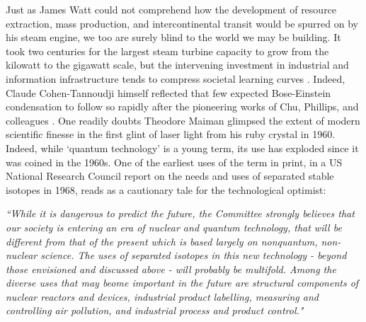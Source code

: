 	\noindent  Just as James Watt could not comprehend how the development of resource extraction, mass production, and intercontinental transit would be spurred on by his steam engine, we too are surely blind to the world we {may} be building.
	It took two centuries for the largest steam turbine capacity to grow from the kilowatt to the gigawatt scale, but the intervening investment in industrial and information infrastructure tends to compress societal learning curves \cite{SmilEnergy}.
	Indeed, Claude Cohen-Tannoudji himself reflected that few expected Bose-Einstein condensation to follow so rapidly after the pioneering works of Chu, Phillips, and colleagues \cite{CTNote}.
	One readily doubts Theodore Maiman glimpsed the extent of modern scientific finesse in the first glint of laser light from his ruby crystal in 1960.
	Indeed, while `quantum technology' is a young term, its use has exploded since it was coined in the 1960s.
	One of the earliest uses of the term in print, in a US National Research Council report \cite{Isotopes69} on the needs and uses of separated stable isotopes in 1968, reads as a cautionary tale for the technological optimist:

	\bigskip
	\hfill
	\begin{minipage}{0.9\textwidth}
	\emph{``While it is dangerous to predict the future, the Committee strongly believes that our society is entering an era of nuclear and quantum technology, that will be different from that of the present which is based largely on nonquantum, non-nuclear science. The uses of separated isotopes in this new technology - beyond those envisioned and discussed above - will probably be multifold. Among the diverse uses that may beome important in the future are structural components of nuclear reactors and devices, industrial product labelling, measuring and controlling air pollution, and industrial process and product control."}
	\end{minipage}
	\bigskip
	
